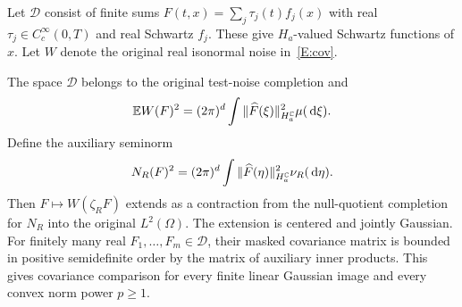 Let $\mathcal{D}$ consist of finite sums $F(t,x) = \sum_j\tau_j(t)f_j(x)$ with
real $\tau_j \in C_c^\infty(0,T)$ and real Schwartz $f_j$. These give
$H_a$-valued Schwartz functions of $x$. Let $W$ denote the original real
isonormal noise in~\eqref{E:cov}.

\begin{proposition}\label{P:masked-noise-completion}
  The space $\mathcal{D}$ belongs to the original test-noise completion and
  \begin{equation}\label{E:masked-actual-noise-norm}
    \mathbb{E} W(F)^2 = (2\pi)^d\int
    \|\widehat{F}(\xi)\|_{H_a^{\mathbb{C}}}^2\mu(\,\mathrm{d}\xi).
  \end{equation}
  Define the auxiliary seminorm
  \[
    N_R(F)^2 = (2\pi)^d\int
    \|\widehat{F}(\eta)\|_{H_a^{\mathbb{C}}}^2\nu_R(\,\mathrm{d}\eta).
  \]
  Then $F \mapsto W(\zeta_RF)$ extends as a contraction from the null-quotient
  completion for $N_R$ into the original $L^2(\Omega)$. The extension is
  centered and jointly Gaussian. For finitely many real $F_1,\ldots,F_m \in
  \mathcal{D}$, their masked covariance matrix is bounded in positive
  semidefinite order by the matrix of auxiliary inner products. This gives
  covariance comparison for every finite linear Gaussian image and every convex
  norm power $p \ge 1$.
\end{proposition}

